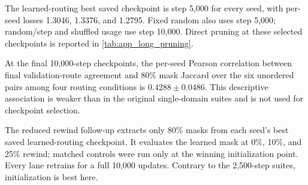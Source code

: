 \documentclass{article}
\begin{document}
The learned-routing best saved checkpoint is step 5,000 for every seed, with
per-seed losses 1.3046, 1.3376, and 1.2795. Fixed random also uses step 5,000;
random/step and shuffled usage use step 10,000. Direct pruning at these selected
checkpoints is reported in \cref{tab:app_long_pruning}.

\begin{table}[t]
\centering
\scriptsize
\caption{Long-budget direct pruning at each condition's best saved checkpoint.
Entries are three-seed means; uncertainty is omitted for table width.}
\label{tab:app_long_pruning}
\end{table}

At the final 10,000-step checkpoints, the per-seed Pearson correlation between
final validation-route agreement and 80\% mask Jaccard over the six unordered
pairs among four routing conditions is $0.4288\pm0.0486$. This descriptive
association is weaker than in the original single-domain suites and is not used
for checkpoint selection.

The reduced rewind follow-up extracts only 80\% masks from each seed's best
saved learned-routing checkpoint. It evaluates the learned mask at 0\%, 10\%,
and 25\% rewind; matched controls were run only at the winning initialization
point. Every lane retrains for a full 10,000 updates. Contrary to the
2,500-step suites, initialization is best here.
\end{document}
